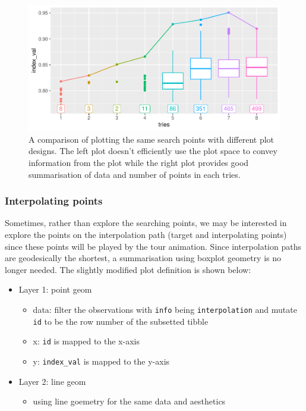 \documentclass[12pt]{article}
\providecommand{\tightlist}{%
  \setlength{\itemsep}{0pt}\setlength{\parskip}{0pt}}
\begin{document}
\begin{figure}
\centering
\includegraphics{paper_files/figure-latex/points-tries-1.pdf}
\caption{\label{points}A comparison of plotting the same search points
with different plot designs. The left plot doesn't efficiently use the
plot space to convey information from the plot while the right plot
provides good summarisation of data and number of points in each tries.}
\end{figure}

\hypertarget{interpolating-points}{%
\subsubsection{Interpolating points}\label{interpolating-points}}

Sometimes, rather than explore the searching points, we may be
interested in explore the points on the interpolation path (target and
interpolating points) since these points will be played by the tour
animation. Since interpolation paths are geodesically the shortest, a
summarisation using boxplot geometry is no longer needed. The slightly
modified plot definition is shown below:

\begin{itemize}
\tightlist
\item
  Layer 1: point geom

  \begin{itemize}
  \tightlist
  \item
    data: filter the observations with \texttt{info} being
    \texttt{interpolation} and mutate \texttt{id} to be the row number
    of the subsetted tibble
  \item
    x: \texttt{id} is mapped to the x-axis
  \item
    y: \texttt{index\_val} is mapped to the y-axis
  \end{itemize}
\item
  Layer 2: line geom

  \begin{itemize}
  \tightlist
  \item
    using line goemetry for the same data and aesthetics
  \end{itemize}
\end{itemize}
\end{document}
